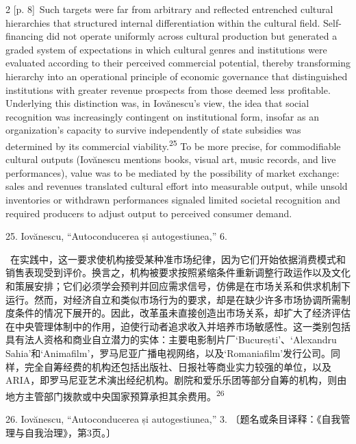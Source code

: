 \documentclass[10pt,a4paper]{article}
\begin{document}
\begin{paracol}{2}
\switchcolumn
{\scriptsize\color{gray} [p. 8]}\ Such targets were far from arbitrary and reflected entrenched cultural hierarchies that structured internal differentiation within the cultural field. Self-financing did not operate uniformly across cultural production but generated a graded system of expectations in which cultural genres and institutions were evaluated according to their perceived commercial potential, thereby transforming hierarchy into an operational principle of economic governance that distinguished institutions with greater revenue prospects from those deemed less profitable. Underlying this distinction was, in Iovănescu’s view, the idea that social recognition was increasingly contingent on institutional form, insofar as an organization’s capacity to survive independently of state subsidies was determined by its commercial viability.\nobreak\textsuperscript{25} To be more precise, for commodifiable cultural outputs (Iovănescu mentions books, visual art, music records, and live performances), value was to be mediated by the possibility of market exchange: sales and revenues translated cultural effort into measurable output, while unsold inventories or withdrawn performances signaled limited societal recognition and required producers to adjust output to perceived consumer demand.\par{\small 25. Iovănescu, “Autoconducerea și autogestiunea,” 6.\par}
\switchcolumn*
{\scriptsize\color{gray} [p. 8]}\ 在实践中，这一要求使机构接受某种准市场纪律，因为它们开始依据消费模式和销售表现受到评价。换言之，机构被要求按照紧缩条件重新调整行政运作以及文化和策展安排；它们必须学会预判并回应需求信号，仿佛是在市场关系和供求机制下运行。然而，对经济自立和类似市场行为的要求，却是在缺少许多市场协调所需制度条件的情况下展开的。因此，改革虽未直接创造出市场关系，却扩大了经济评估在中央管理体制中的作用，迫使行动者追求收入并培养市场敏感性。这一类别包括具有法人资格和商业自立潜力的实体：主要电影制片厂‘București’、‘Alexandru Sahia’和‘Animafilm’，罗马尼亚广播电视网络，以及‘Romaniafilm’发行公司。同样，完全自筹经费的机构还包括出版社、日报社等商业实力较强的单位，以及ARIA，即罗马尼亚艺术演出经纪机构。剧院和爱乐乐团等部分自筹的机构，则由地方主管部门拨款或中央国家预算承担其余费\mbox{用。\textsuperscript{26}}\par{\small 26. Iovănescu, “Autoconducerea și autogestiunea,” 3. 〔题名或条目译释：《自我管理与自我治理》，第3页。〕\par}
\switchcolumn

\end{paracol}
\end{document}

